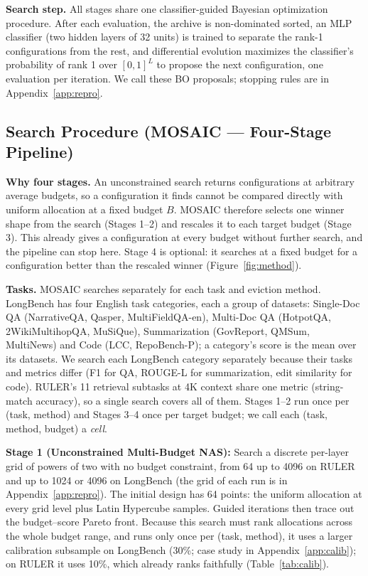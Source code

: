 \documentclass[11pt]{article}
\begin{document}
\textbf{Search step.} All stages share one classifier-guided Bayesian optimization procedure. After each evaluation, the archive is non-dominated sorted, an MLP classifier (two hidden layers of 32 units) is trained to separate the rank-1 configurations from the rest, and differential evolution maximizes the classifier's probability of rank 1 over $[0,1]^L$ to propose the next configuration, one evaluation per iteration. We call these BO proposals; stopping rules are in Appendix~\ref{app:repro}.

\subsection{Search Procedure (MOSAIC — Four-Stage Pipeline)}

\textbf{Why four stages.} An unconstrained search returns configurations at arbitrary average budgets, so a configuration it finds cannot be compared directly with uniform allocation at a fixed budget $B$. MOSAIC therefore selects one winner shape from the search (Stages 1--2) and rescales it to each target budget (Stage 3). This already gives a configuration at every budget without further search, and the pipeline can stop here. Stage 4 is optional: it searches at a fixed budget for a configuration better than the rescaled winner (Figure~\ref{fig:method}).

\textbf{Tasks.}\label{sec:method-tasks} MOSAIC searches separately for each task and eviction method. LongBench has four English task categories, each a group of datasets: Single-Doc QA (NarrativeQA, Qasper, MultiFieldQA-en), Multi-Doc QA (HotpotQA, 2WikiMultihopQA, MuSiQue), Summarization (GovReport, QMSum, MultiNews) and Code (LCC, RepoBench-P); a category's score is the mean over its datasets. We search each LongBench category separately because their tasks and metrics differ (F1 for QA, ROUGE-L for summarization, edit similarity for code). RULER's 11 retrieval subtasks at 4K context share one metric (string-match accuracy), so a single search covers all of them. Stages 1--2 run once per (task, method) and Stages 3--4 once per target budget; we call each (task, method, budget) a \emph{cell}.

\textbf{Stage 1 (Unconstrained Multi-Budget NAS):} Search a discrete per-layer grid of powers of two with no budget constraint, from 64 up to 4096 on RULER and up to 1024 or 4096 on LongBench (the grid of each run is in Appendix~\ref{app:repro}). The initial design has 64 points: the uniform allocation at every grid level plus Latin Hypercube samples. Guided iterations then trace out the budget--score Pareto front. Because this search must rank allocations across the whole budget range, and runs only once per (task, method), it uses a larger calibration subsample on LongBench (30\%; case study in Appendix~\ref{app:calib}); on RULER it uses 10\%, which already ranks faithfully (Table~\ref{tab:calib}).
\end{document}
